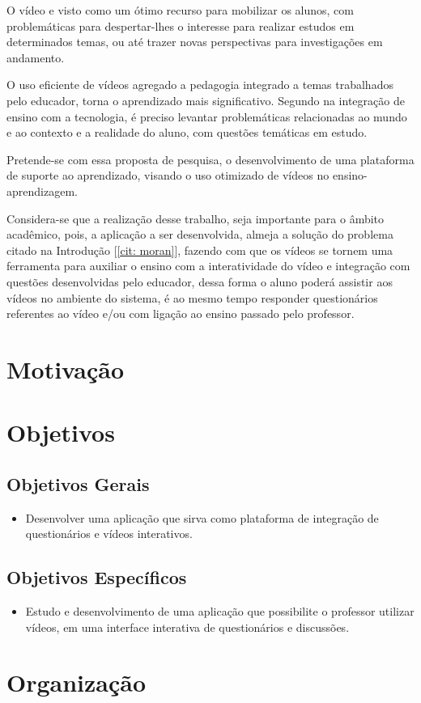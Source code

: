 \par
O vídeo e visto como um ótimo recurso para mobilizar os alunos, com problemáticas para despertar-lhes o interesse para realizar estudos em determinados temas, ou até trazer novas perspectivas para investigações em andamento.
\par
O uso eficiente de vídeos agregado a pedagogia integrado a temas trabalhados pelo educador, torna o aprendizado mais significativo. Segundo \cite{almeida} na integração de ensino com a tecnologia, é preciso levantar problemáticas relacionadas ao mundo e ao contexto e a realidade do aluno, com questões temáticas em estudo. 
\par
Pretende-se com essa proposta de pesquisa, o desenvolvimento de uma plataforma de suporte ao aprendizado, visando o uso otimizado de vídeos no ensino-aprendizagem.
\par
Considera-se que a realização desse trabalho, seja importante para o âmbito acadêmico, pois, a aplicação a ser desenvolvida, almeja a solução do problema citado na Introdução [\ref{cit: moran}], fazendo com que os vídeos se tornem uma ferramenta para auxiliar o ensino com a interatividade do vídeo e integração com questões desenvolvidas pelo educador, dessa forma o aluno poderá assistir aos vídeos no ambiente do sistema, é ao mesmo tempo responder questionários referentes ao vídeo e/ou com ligação ao ensino passado pelo professor.

\section{Motivação}
\section{Objetivos}
\subsection{Objetivos Gerais}
\begin{itemize}
  \item Desenvolver uma aplicação que sirva como plataforma de integração de questionários e vídeos interativos.
\end{itemize}
\subsection{Objetivos Específicos}
\begin{itemize}
  \item Estudo e desenvolvimento de uma aplicação que possibilite o professor utilizar vídeos, em uma interface interativa de questionários e discussões.
\end{itemize}
\section{Organização}
